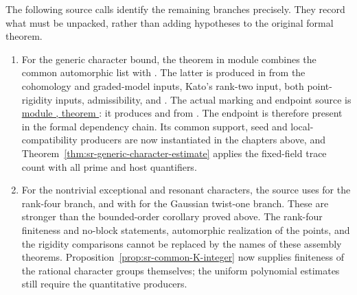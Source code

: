 The following source calls identify the remaining branches precisely.
They record what must be unpacked, rather than adding hypotheses
to the original formal theorem.
\begin{enumerate}
\item For the generic character bound,
the theorem 
in module  combines the common automorphic list with
.
The latter is produced in  from the cohomology
and graded-model inputs, Kato's rank-two input, both point-rigidity
inputs, admissibility, and
.
The actual marking and endpoint source is
\href{https://github.com/ChristianKudeba/alpoge-rh-verification/blob/alpoge-source-7cbf7a0c/src/Development/AutomorphicArithmetic/AutomorphicVarieties/ModularityArgument/ThresholdArguments/DenseThresholdCases/DnEndsTop.lean}{module , theorem }:
it produces  and  from
.
The endpoint is therefore present in the formal dependency chain.
Its common support, seed and local-compatibility producers are
now instantiated in the chapters above, and
Theorem~\ref{thm:sr-generic-character-estimate} applies the
fixed-field trace count with all prime and host quantifiers.

\item For the nontrivial exceptional and resonant characters,
the source
\href{https://github.com/ChristianKudeba/alpoge-rh-verification/blob/alpoge-source-7cbf7a0c/src/Development/AutomorphicArithmetic/AutomorphicVarieties/ModularityArgument/ThresholdArguments/DenseThresholdCases/WindowBoundOfLiteratureLevel.lean}{}
uses 
for the rank-four branch, and
with  for the Gaussian twist-one branch.
These are stronger than the bounded-order corollary proved above.
The rank-four finiteness and no-block statements, automorphic
realization of the points, and the rigidity comparisons cannot be
replaced by the names of these assembly theorems.
Proposition~\ref{prop:sr-common-K-integer} now supplies finiteness
of the rational character groups themselves; the uniform
polynomial estimates still require the quantitative producers.


\end{enumerate}
